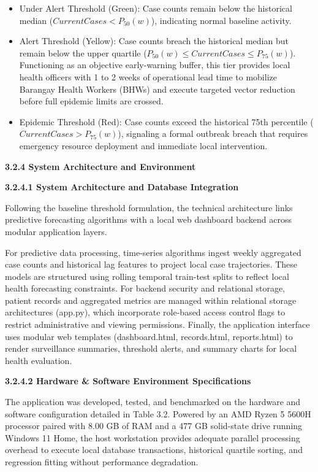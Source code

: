 \documentclass[
]{article}
\begin{document}
\begin{itemize}
\item
  Under Alert Threshold (Green): Case counts remain below the historical
  median (\(CurrentCases < P_{50}(w)\)), indicating normal baseline
  activity.
\item
  Alert Threshold (Yellow): Case counts breach the historical median but
  remain below the upper quartile
  (\(P_{50}(w) \leq CurrentCases \leq P_{75}(w)\)). Functioning as an
  objective early-warning buffer, this tier provides local health
  officers with 1 to 2 weeks of operational lead time to mobilize
  Barangay Health Workers (BHWs) and execute targeted vector reduction
  before full epidemic limits are crossed.
\item
  Epidemic Threshold (Red): Case counts exceed the historical 75th
  percentile (\(CurrentCases > P_{75}(w)\)), signaling a formal outbreak
  breach that requires emergency resource deployment and immediate local
  intervention.
\end{itemize}

\textbf{3.2.4 System Architecture and Environment}

\textbf{3.2.4.1 System Architecture and Database Integration}

Following the baseline threshold formulation, the technical architecture
links predictive forecasting algorithms with a local web dashboard
backend across modular application layers.

For predictive data processing, time-series algorithms ingest weekly
aggregated case counts and historical lag features to project local case
trajectories. These models are structured using rolling temporal
train-test splits to reflect local health forecasting constraints. For
backend security and relational storage, patient records and aggregated
metrics are managed within relational storage architectures (app.py),
which incorporate role-based access control flags to restrict
administrative and viewing permissions. Finally, the application
interface uses modular web templates (dashboard.html, records.html,
reports.html) to render surveillance summaries, threshold alerts, and
summary charts for local health evaluation.

\textbf{3.2.4.2 Hardware \& Software Environment Specifications}

The application was developed, tested, and benchmarked on the hardware
and software configuration detailed in Table 3.2. Powered by an AMD
Ryzen 5 5600H processor paired with 8.00 GB of RAM and a 477 GB
solid-state drive running Windows 11 Home, the host workstation provides
adequate parallel processing overhead to execute local database
transactions, historical quartile sorting, and regression fitting
without performance degradation.
\end{document}
